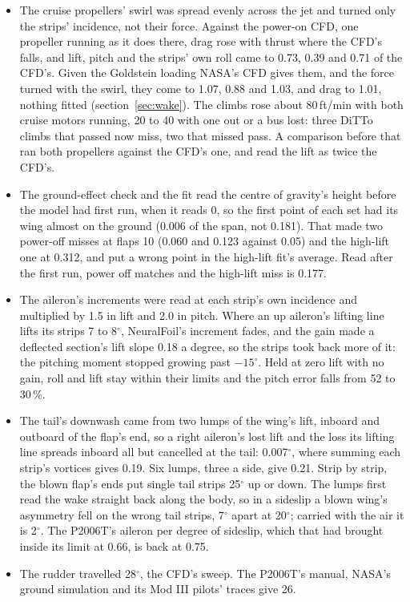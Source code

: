 \documentclass[10pt,a4paper,twocolumn]{article}
\begin{document}
\begin{itemize}
\item The cruise propellers' swirl was spread evenly across the jet and turned only the strips' incidence, not their force. Against the power-on CFD, one propeller running as it does there, drag rose with thrust where the CFD's falls, and lift, pitch and the strips' own roll came to 0.73, 0.39 and 0.71 of the CFD's. Given the Goldstein loading NASA's CFD gives them, and the force turned with the swirl, they come to 1.07, 0.88 and 1.03, and drag to 1.01, nothing fitted (section~\ref{sec:wake}). The climbs rose about 80\,ft/min with both cruise motors running, 20 to 40 with one out or a bus lost: three DiTTo climbs that passed now miss, two that missed pass. A comparison before that ran both propellers against the CFD's one, and read the lift as twice the CFD's.
\item The ground-effect check and the fit read the centre of gravity's height before the model had first run, when it reads 0, so the first point of each set had its wing almost on the ground (0.006 of the span, not 0.181). That made two power-off misses at flaps 10 (0.060 and 0.123 against 0.05) and the high-lift one at 0.312, and put a wrong point in the high-lift fit's average. Read after the first run, power off matches and the high-lift miss is 0.177.
\item The aileron's increments were read at each strip's own incidence and multiplied by 1.5 in lift and 2.0 in pitch. Where an up aileron's lifting line lifts its strips 7 to 8$^\circ$, NeuralFoil's increment fades, and the gain made a deflected section's lift slope 0.18 a degree, so the strips took back more of it: the pitching moment stopped growing past $-15^\circ$. Held at zero lift with no gain, roll and lift stay within their limits and the pitch error falls from 52 to 30\,\%.
\item The tail's downwash came from two lumps of the wing's lift, inboard and outboard of the flap's end, so a right aileron's lost lift and the loss its lifting line spreads inboard all but cancelled at the tail: 0.007$^\circ$, where summing each strip's vortices gives 0.19. Six lumps, three a side, give 0.21. Strip by strip, the blown flap's ends put single tail strips 25$^\circ$ up or down. The lumps first read the wake straight back along the body, so in a sideslip a blown wing's asymmetry fell on the wrong tail strips, 7$^\circ$ apart at 20$^\circ$; carried with the air it is 2$^\circ$. The P2006T's aileron per degree of sideslip, which that had brought inside its limit at 0.66, is back at 0.75.
\item The rudder travelled 28$^\circ$, the CFD's sweep. The P2006T's manual, NASA's ground simulation and its Mod III pilots' traces give 26.

\end{itemize}
\end{document}
